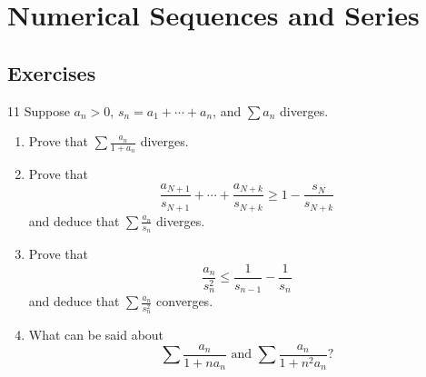 \clearpage

\section{Numerical Sequences and Series}
\subsection*{Exercises}

\begin{exercise}{11}
Suppose $a_n>0$, $s_n=a_1+\cdots+a_n$, and $\sum a_n$ diverges.
\begin{enumerate}
    \item[(a)] Prove that $\sum\frac{a_n}{1+a_n}$ diverges.
    \item[(b)] Prove that 
\[
\frac{a_{N+1}}{s_{N+1}} + \cdots + \frac{a_{N+k}}{s_{N+k}} \geq 1- \frac{s_{N}}{s_{N+k}}
\]
and deduce that $\sum \frac{a_n}{s_n}$ diverges.
    \item[(c)] Prove that
\[
\frac{a_n}{s_n^2} \leq \frac{1}{s_{n-1}}-\frac{1}{s_n}
\]
and deduce that $\sum \frac{a_n}{s_n^2}$ converges.
    \item[(d)] What can be said about
\[
\sum \frac{a_n}{1+na_n} \text{ and } \sum \frac{a_n}{1+n^2a_n} ?
\]
\end{enumerate}
\end{exercise}
